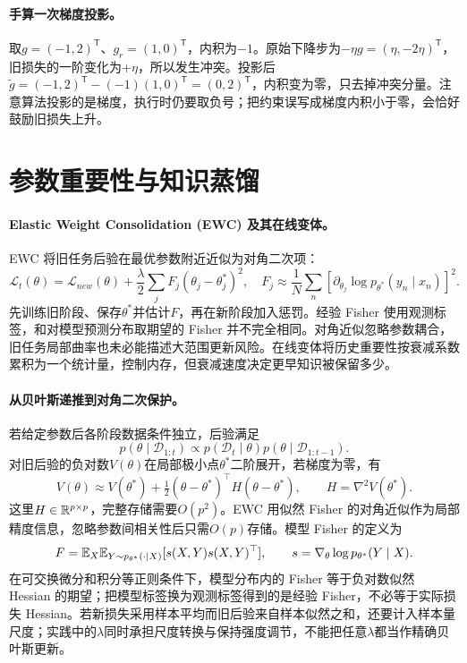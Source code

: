 \paragraph{手算一次梯度投影。}
取$g=(-1,2)^{\mathsf T}$、$g_r=(1,0)^{\mathsf T}$，内积为$-1$。原始下降步为$-\eta g=(\eta,-2\eta)^{\mathsf T}$，旧损失的一阶变化为$+\eta$，所以发生冲突。投影后$\tilde g=(-1,2)^{\mathsf T}-(-1)(1,0)^{\mathsf T}=(0,2)^{\mathsf T}$，内积变为零，只去掉冲突分量。注意算法投影的是梯度，执行时仍要取负号；把约束误写成梯度内积小于零，会恰好鼓励旧损失上升。

\section{参数重要性与知识蒸馏}
\paragraph{Elastic Weight Consolidation (EWC) 及其在线变体。}
EWC 将旧任务后验在最优参数附近近似为对角二次项\cite{kirkpatrick2017ewc}：
\begin{equation}
 \mathcal L_t(\theta)=\mathcal L_{new}(\theta)
 +\frac\lambda2\sum_jF_j(\theta_j-\theta_j^*)^2,
 \quad
 F_j\approx\frac1N\sum_n[\partial_{\theta_j}\log p_{\theta^*}(y_n\mid x_n)]^2.
\end{equation}
先训练旧阶段、保存$\theta^*$并估计$F$，再在新阶段加入惩罚。经验 Fisher 使用观测标签，和对模型预测分布取期望的 Fisher 并不完全相同。对角近似忽略参数耦合，旧任务局部曲率也未必能描述大范围更新风险。在线变体将历史重要性按衰减系数累积为一个统计量，控制内存，但衰减速度决定更早知识被保留多少。

\paragraph{从贝叶斯递推到对角二次保护。}
若给定参数后各阶段数据条件独立，后验满足
\begin{equation}
 p(\theta\mid\mathcal D_{1:t})\propto p(\mathcal D_t\mid\theta)
 p(\theta\mid\mathcal D_{1:t-1}).
\end{equation}
对旧后验的负对数$V(\theta)$在局部极小点$\theta^*$二阶展开，若梯度为零，有
\begin{equation}
 V(\theta)\approx V(\theta^*)+\tfrac12(\theta-\theta^*)^\top H(\theta-\theta^*),
 \qquad H=\nabla^2V(\theta^*).
\end{equation}
这里$H\in\mathbb{R}^{p\times p}$，完整存储需要$O(p^2)$。EWC 用似然 Fisher 的对角近似作为局部精度信息，忽略参数间相关性后只需$O(p)$存储。模型 Fisher 的定义为
\begin{equation}
 F=\mathbb{E}_{X}\mathbb{E}_{Y\sim p_{\theta^*}(\cdot\mid X)}[s(X,Y)s(X,Y)^\top],
 \qquad s=\nabla_\theta\log p_{\theta^*}(Y\mid X).
\end{equation}
在可交换微分和积分等正则条件下，模型分布内的 Fisher 等于负对数似然 Hessian 的期望；把模型标签换为观测标签得到的是经验 Fisher，不必等于实际损失 Hessian。若新损失采用样本平均而旧后验来自样本似然之和，还要计入样本量尺度；实践中的$\lambda$同时承担尺度转换与保持强度调节，不能把任意$\lambda$都当作精确贝叶斯更新。

